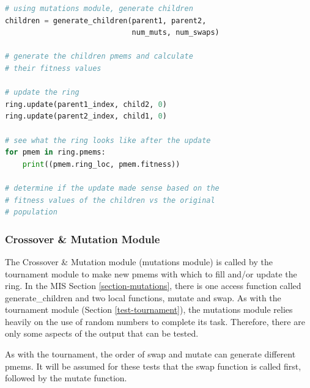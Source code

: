 \documentclass[12pt, titlepage]{article}
\begin{document}
\begin{enumerate}
\begin{lstlisting}[language=python, showstringspaces=false]
# using mutations module, generate children
children = generate_children(parent1, parent2,
                             num_muts, num_swaps)

# generate the children pmems and calculate
# their fitness values

# update the ring
ring.update(parent1_index, child2, 0)
ring.update(parent2_index, child1, 0)

# see what the ring looks like after the update
for pmem in ring.pmems:
	print((pmem.ring_loc, pmem.fitness))

# determine if the update made sense based on the
# fitness values of the children vs the original
# population

\end{lstlisting}

\end{enumerate}

\subsubsection{Crossover \& Mutation Module}

The Crossover \& Mutation module (mutations module) is called by the 
tournament module to make new pmems with which to fill and/or update the ring. 
In the MIS Section \ref{section-mutations}, there is one access function called 
generate\_children and two local functions, mutate and swap. As with the 
tournament module (Section \ref{test-tournament}), the mutations module relies 
heavily on the use of random numbers to complete its task. Therefore, there are 
only some aspects of the output that can be tested.

As with the tournament, the order of swap and mutate can generate different 
pmems. It will be assumed for these tests that the swap function is called 
first, followed by the mutate function.
\end{document}
